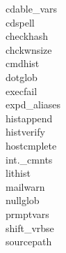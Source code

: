 \vspace{-3mm} %
{\footnotesize \begin{multicols*}{4}
    cdable\_vars \\
    cdspell \\
    checkhash \\
    ch\textquotesingle ckw\textquotesingle nsize \\
    cmdhist \\
    dotglob \\
    execfail \\
    exp\textquotesingle d\_aliases \\
    histappend \\
    histverify \\
    hostc\textquotesingle mplete \\
    int.\_c\textquotesingle mnts \\
    lithist \\
    mailwarn \\
    nullglob \\
    pr\textquotesingle mptvars \\
    shift\_vrb\textquotesingle se \\
    sourcepath \\
\end{multicols*}}



